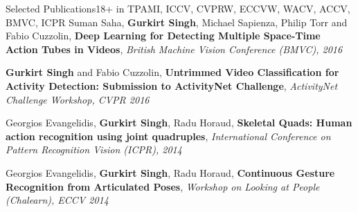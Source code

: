 \documentclass{resume_long} %
\begin{document}
\begin{rSection}{Selected Publications}{18+\footnotesize{ in TPAMI, ICCV, CVPRW, ECCVW, WACV, ACCV, BMVC, ICPR}}
\vspace{-0.03in}
\small{Suman Saha, \textbf{Gurkirt Singh}, Michael Sapienza, Philip Torr and Fabio Cuzzolin},
\textbf{Deep Learning for Detecting Multiple Space-Time Action Tubes in Videos},
\textit{\small{British Machine Vision Conference (BMVC), 2016}}

\vspace{-0.03in}
\small{\textbf{Gurkirt Singh} and Fabio Cuzzolin},
\textbf{Untrimmed Video Classification for Activity Detection: Submission to ActivityNet Challenge},
\textit{\small{ActivityNet Challenge Workshop, CVPR 2016}}


\vspace{-0.03in}
\small{Georgios Evangelidis, \textbf{Gurkirt Singh}, Radu Horaud},
\textbf{Skeletal Quads: Human action recognition using joint quadruples},
\textit{\small{International Conference on Pattern Recognition Vision (ICPR), 2014}}


\vspace{-0.03in}
\small{Georgios Evangelidis, \textbf{Gurkirt Singh}, Radu Horaud},
\textbf{Continuous Gesture Recognition from Articulated Poses},
\textit{\small{Workshop on Looking at People (Chalearn), ECCV 2014}}



\end{rSection}
\end{document}
